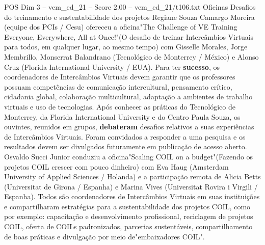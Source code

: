 \begin{textsample}{POS Dim 3 – vem\_ed\_21 – Score 2.00 – vem\_ed\_21/t106.txt}  \label{ex:f3_pos_111}
Oficinas Desafios do treinamento e sustentabilidade dos projetos Regiane Souza Camargo Moreira (equipe dos PCIs / Cesu) ofereceu a oficina"The Challenge of VE Training Everyone, Everywhere, All at Once!"(O desafio de treinar Intercâmbios Virtuais para todos, em qualquer lugar, ao mesmo tempo) com Gisselle Morales, Jorge Membrillo, Monserrat Balandrano (Tecnológico de Monterrey / México) e Alonso Cruz (Florida International University / EUA).
Para ter \textbf{sucesso}, os coordenadores de Intercâmbios Virtuais devem garantir que os professores possuam competências de comunicação intercultural, pensamento crítico, cidadania global, colaboração multicultural, adaptação a ambientes de trabalho virtuais e uso de tecnologias.
Após conhecer as práticas do Tecnológico de Monterrey, da Florida International University e do Centro Paula Souza, os ouvintes, reunidos em grupos, \textbf{debateram} desafios relativos a suas experiências de Intercâmbios Virtuais.
Foram convidados a responder a uma pesquisa e os resultados devem ser divulgados futuramente em publicação de acesso aberto.
Osvaldo Succi Junior conduziu a oficina"Scaling COIL on a budget"(Fazendo os projetos COIL crescer com pouco dinheiro) com Eva Haug (Amsterdam University of Applied Sciences / Holanda) e a participação remota de Alicia Betts (Universitat de Girona / Espanha) e Marina Vives (Universitat Rovira i Virgili / Espanha).
Todos são coordenadores de Intercâmbios Virtuais em suas instituições e compartilharam estratégias para a sustentabilidade dos projetos COIL, como por exemplo: capacitação e desenvolvimento profissional, reciclagem de projetos COIL, oferta de COILs padronizados, parcerias sustentáveis, compartilhamento de boas práticas e divulgação por meio de"embaixadores COIL".

\end{textsample}
